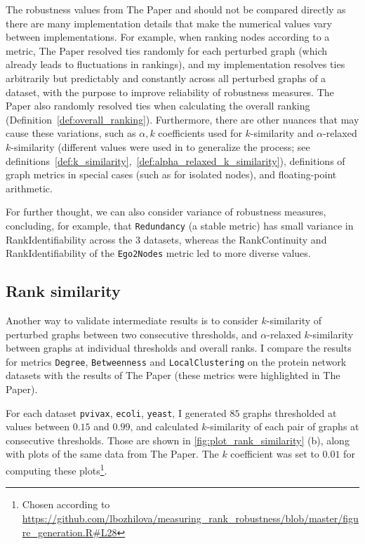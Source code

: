 The robustness values from The Paper and \graffs should not be compared directly as there are many implementation details that make the numerical values vary between implementations.
For example, when ranking nodes according to a metric, The Paper resolved ties randomly for each perturbed graph (which already leads to fluctuations in rankings), and my implementation resolves ties arbitrarily but predictably and constantly across all perturbed graphs of a dataset, with the purpose to improve reliability of robustness measures.
The Paper also randomly resolved ties when calculating the overall ranking (Definition~\ref{def:overall_ranking}).
Furthermore, there are other nuances that may cause these variations, such as $\alpha,k$ coefficients used for $k$-similarity and $\alpha$-relaxed $k$-similarity (different values were used in \graffs to generalize the process; see definitions~\ref{def:k_similarity},~\ref{def:alpha_relaxed_k_similarity}), definitions of graph metrics in special cases (such as for isolated nodes), and floating-point arithmetic.

For further thought, we can also consider variance of robustness measures, concluding, for example, that \texttt{Redundancy} (a stable metric) has small variance in RankIdentifiability across the 3 datasets, whereas the RankContinuity and RankIdentifiability of the \texttt{Ego2Nodes} metric led to more diverse values.

\subsection{Rank similarity}

Another way to validate intermediate results is to consider $k$-similarity of perturbed graphs between two consecutive thresholds, and $\alpha$-relaxed $k$-similarity between graphs at individual thresholds and overall ranks.
I compare the results for metrics \texttt{Degree}, \texttt{Betweenness} and \texttt{LocalClustering} on the protein network datasets with the results of The Paper (these metrics were highlighted in The Paper).



For each dataset \texttt{pvivax}, \texttt{ecoli}, \texttt{yeast}, I generated $85$ graphs thresholded at values between $0.15$ and $0.99$, and calculated $k$-similarity of each pair of graphs at consecutive thresholds. Those are shown in \autoref{fig:plot_rank_similarity} (b), along with plots of the same data from The Paper.
The $k$ coefficient was set to $0.01$ for computing these plots\footnote{Chosen according to \url{https://github.com/lbozhilova/measuring_rank_robustness/blob/master/figure_generation.R#L28}}.

